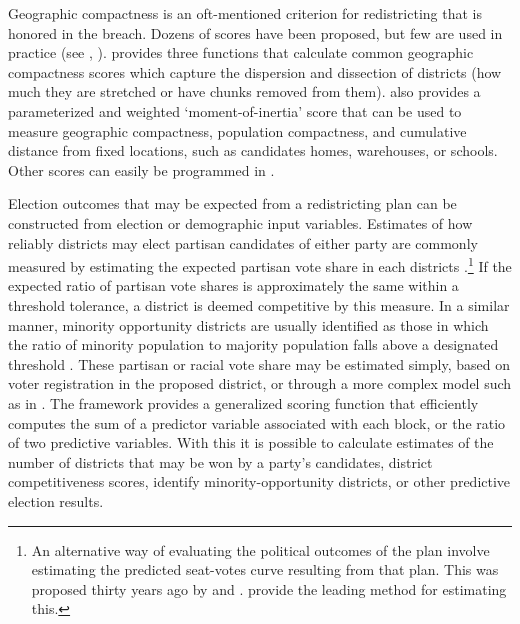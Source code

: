 \documentclass[article]{JSSstyle/jss}
\begin{document}
Geographic compactness is an oft-mentioned criterion for redistricting 
that is honored in the breach.  Dozens of scores have been proposed, but 
few are used in practice (see \citet{Altman98}, \citet{Niemi91}).  provides three functions that calculate common geographic compactness scores which capture the dispersion and dissection of districts (how much they are stretched or have chunks removed from them).  also provides a parameterized and weighted `moment-of-inertia' score that can be used to measure geographic compactness, population compactness, and cumulative distance from fixed locations, such as candidates homes, warehouses, or schools. Other scores can easily be programmed in .

Election outcomes that may be expected from a redistricting plan can be constructed from election or demographic input variables. Estimates of how reliably 
districts may elect partisan candidates of either party are commonly measured by estimating the expected partisan vote share in each districts \citep{McDonald06a}.\footnote{An alternative way of evaluating the political outcomes of the plan involve estimating the predicted seat-votes curve resulting from that plan. This was proposed thirty years ago 
by \citet{Tufte73} and \citet{NieDee78}. \citet{GelKing94} provide the leading method for estimating this.} 
If the expected ratio of partisan vote shares is approximately the same within a threshold tolerance, a district is deemed competitive by this measure. 
In a similar manner, minority opportunity districts are usually identified as those in which the ratio of minority 
population to majority population falls above a designated threshold \citep{GrofHand92}.
These partisan or racial vote share may be estimated simply, based on voter registration in the proposed 
district, or through a more complex model such as in \citet{GelKing94}.  The  
framework provides a generalized scoring function that efficiently computes the sum of a predictor variable 
associated with each block, or the ratio of two predictive variables. With this it is 
possible to calculate estimates of the number of districts that may be won by a party's candidates, district competitiveness scores, 
identify minority-opportunity districts, or other predictive election results.  
\end{document}
